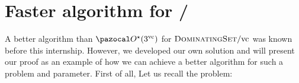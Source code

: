 \section{Faster algorithm for /\vc}
\label{section:domset-vc}

A better algorithm than $\O^\star(3^\vc)$ for $\textsc{DominatingSet}/\text{vc}$ was known before this internship. However, we developed our own solution and will present our proof as an example of how we can achieve a better algorithm for such a problem and parameter. First of all, Let us recall the  problem:

\begin{problem}
\end{problem}

